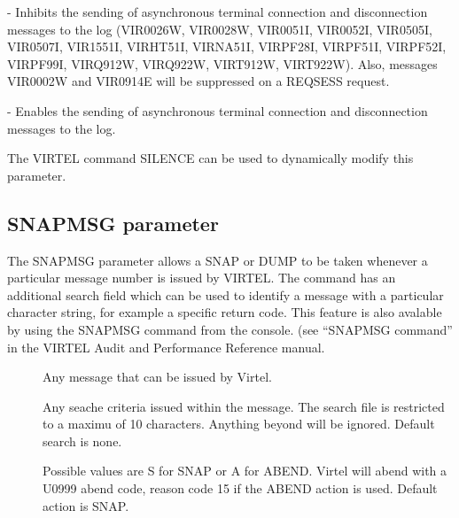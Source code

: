 \documentclass[letterpaper,10pt,english]{sphinxmanual}
\begin{document}
 - Inhibits the sending of asynchronous terminal connection and disconnection messages to the log (VIR0026W, VIR0028W, VIR0051I, VIR0052I, VIR0505I, VIR0507I, VIR1551I, VIRHT51I, VIRNA51I, VIRPF28I, VIRPF51I, VIRPF52I, VIRPF99I, VIRQ912W, VIRQ922W, VIRT912W, VIRT922W). Also, messages VIR0002W and VIR0914E will be suppressed on a REQSESS request.

 - Enables the sending of asynchronous terminal connection and disconnection messages to the log.

The VIRTEL command SILENCE can be used to dynamically modify this parameter.


\subsection{SNAPMSG parameter}
\label{\detokenize{Installation_Guide:index-114}}\label{\detokenize{Installation_Guide:snapmsg-parameter}}
\begin{sphinxVerbatim}[commandchars=\\\{\}]
\end{sphinxVerbatim}

The SNAPMSG parameter allows a SNAP or DUMP to be taken whenever a particular message number is issued by VIRTEL. The command has an additional search field which can be used to identify a message with a particular character string, for example a specific return code. This feature is also avalable by using the SNAPMSG command from the console. (see “SNAPMSG command” in the VIRTEL Audit and Performance Reference manual.
\begin{description}
\item[{}] \leavevmode
Any message that can be issued by Virtel.

\item[{}] \leavevmode
Any seache criteria issued within the message. The search file is restricted to a maximu of 10 characters. Anything beyond will be ignored. Default search is none.

\item[{}] \leavevmode
Possible values are S for SNAP or A for ABEND. Virtel will abend with a U0999 abend code, reason code 15 if the ABEND action is used. Default action is SNAP.

\end{description}
\end{document}

